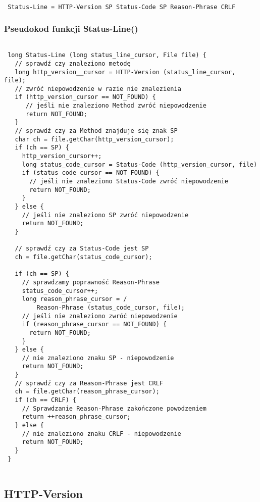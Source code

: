 \documentclass[a4paper,11pt]{report}
\begin{document}
\begin{lstlisting}

 Status-Line = HTTP-Version SP Status-Code SP Reason-Phrase CRLF

\end{lstlisting}

\subsubsection{Pseudokod funkcji Status-Line()}

\begin{lstlisting}

 long Status-Line (long status_line_cursor, File file) {
   // sprawdź czy znaleziono metodę
   long http_version__cursor = HTTP-Version (status_line_cursor, file);
   // zwróć niepowodzenie w razie nie znalezienia
   if (http_version_cursor == NOT_FOUND) {
      // jeśli nie znaleziono Method zwróć niepowodzenie
      return NOT_FOUND;
   }
   // sprawdź czy za Method znajduje się znak SP
   char ch = file.getChar(http_version_cursor);
   if (ch == SP) {
     http_version_cursor++;
     long status_code_cursor = Status-Code (http_version_cursor, file)
     if (status_code_cursor == NOT_FOUND) {
       // jeśli nie znaleziono Status-Code zwróć niepowodzenie
       return NOT_FOUND;
     }
   } else {
     // jeśli nie znaleziono SP zwróć niepowodzenie
     return NOT_FOUND;
   }
   
   // sprawdź czy za Status-Code jest SP
   ch = file.getChar(status_code_cursor);
   
   if (ch == SP) {
     // sprawdzamy poprawność Reason-Phrase
     status_code_cursor++;
     long reason_phrase_cursor = /
         Reason-Phrase (status_code_cursor, file);
     // jeśli nie znaleziono zwróć niepowodzenie     
     if (reason_phrase_cursor == NOT_FOUND) {
       return NOT_FOUND;
     }
   } else {
     // nie znaleziono znaku SP - niepowodzenie
     return NOT_FOUND;   
   }
   // sprawdź czy za Reason-Phrase jest CRLF
   ch = file.getChar(reason_phrase_cursor);
   if (ch == CRLF) {
     // Sprawdzanie Reason-Phrase zakończone powodzeniem
     return ++reason_phrase_cursor; 
   } else {
     // nie znaleziono znaku CRLF - niepowodzenie
     return NOT_FOUND;   
   }
 }
 
\end{lstlisting}

\subsection{HTTP-Version}
\end{document}
